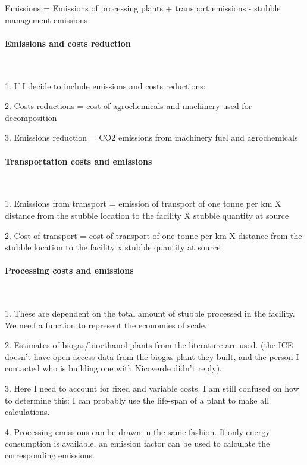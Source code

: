 Emissions =  Emissions of processing plants + transport emissions - stubble management emissions

\paragraph{Emissions and costs reduction} \

1. If I decide to include emissions and costs reductions: 

2. Costs reductions = cost of agrochemicals and machinery used for decomposition

3. Emissions reduction = CO2 emissions from machinery fuel and agrochemicals 

\paragraph{Transportation costs and emissions} \

1. Emissions from transport = emission of transport of one tonne per km X distance from the stubble location to the facility X stubble quantity at source

2. Cost of transport = cost of transport of one tonne per km X distance from the stubble location to the facility x stubble quantity at source

\paragraph{Processing costs and emissions} \

1. These are dependent on the total amount of stubble processed in the facility. We need a function to represent the economies of scale.

2. Estimates of biogas/bioethanol plants from the literature are used. (the ICE doesn't have open-access data from the biogas plant they built, and the person I contacted who is building one with Nicoverde didn't reply).

3. Here I need to account for fixed and variable costs. I am still confused on how to determine this: I can probably use the life-span of a plant to make all calculations.

4. Processing emissions can be drawn in the same fashion. If only energy consumption is available, an emission factor can be used to calculate the corresponding emissions.


